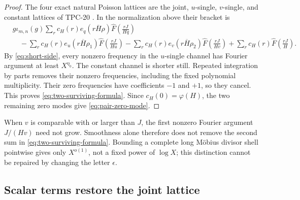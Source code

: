 \begin{proof}
The four exact natural Poisson lattices are the joint, \(u\)-single,
\(v\)-single, and constant lattices of TPC-20
\citep{WangTPC20}.  In the normalization above their bracket is
\begin{align*}
 &g\iota_{m,n}(g)\sum_r
 c_H(r)e_q(r\overline H\rho)
 \widehat F\left(\frac{rJ}{Hq}\right)\\
 &\quad-\sum_r c_H(r)e_u(r\overline H\rho_1)
 \widehat F\left(\frac{rJ}{Hu}\right)
 -\sum_r c_H(r)e_v(r\overline H\rho_2)
 \widehat F\left(\frac{rJ}{Hv}\right)
 +\sum_r c_H(r)\widehat F\left(\frac{rJ}{H}\right).
\end{align*}
By \eqref{eq:short-side}, every nonzero frequency in the
\(u\)-single channel has Fourier argument at least \(X^{\eta_0}\).
The constant channel is shorter still.  Repeated integration by parts
removes their nonzero frequencies, including the fixed polynomial
multiplicity.  Their zero frequencies have coefficients \(-1\) and
\(+1\), so they cancel.  This proves
\eqref{eq:two-surviving-formula}.  Since \(c_H(0)=\varphi(H)\), the
two remaining zero modes give \eqref{eq:pair-zero-mode}.
\end{proof}

\begin{remark}
\label{rem:long-channel-retained}
When \(v\) is comparable with or larger than \(J\), the first nonzero
Fourier argument \(J/(Hv)\) need not grow.  Smoothness alone therefore
does not remove the second sum in
\eqref{eq:two-surviving-formula}.  Bounding a complete long M\"obius
divisor shell pointwise gives only \(X^{o(1)}\), not a fixed power of
\(\log X\); this distinction cannot be repaired by changing the
letter \(\epsilon\).
\end{remark}

\subsection{Scalar terms restore the joint lattice}

